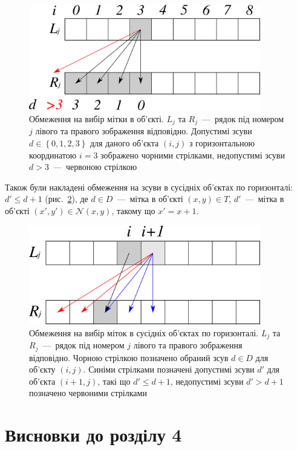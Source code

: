 \begin{figure}[h]
  \centering
  \includegraphics[width=0.9\textwidth]{images/disparity_restriction_vertex}
  \caption{Обмеження на вибір мітки в об'єкті.
           $L_j$ та $R_j$~---~рядок під номером $j$
           лівого та правого зображення відповідно.
           Допустимі зсуви $d \in \left\{0, 1, 2, 3 \right\}$
           для даного об'єкта $\left(i, j \right)$
           з горизонтальною координатою $i = 3$
           зображено чорними стрілками,
           недопустимі зсуви $d > 3$~---~червоною стрілкою}
  \label{fig:disparity:restriction:vertex}
\end{figure}

Також були накладені обмеження на зсуви в сусідніх об'єктах по горизонталі:
$d' \le d + 1$ (рис.~\ref{fig:disparity:restriction:edge}),
де $d \in D$~---~мітка в об'єкті $\left(x, y \right) \in T$,
$d'$~---~мітка в об'єкті
$\left(x', y' \right) \in \mathcal{N} \left(x, y \right)$,
такому що $x' = x + 1$.

\begin{figure}[h]
  \centering
  \includegraphics[width=0.9\textwidth]{images/disparity_restriction_edges}
  \caption{Обмеження на вибір міток в сусідніх об'єктах по горизонталі.
           $L_j$ та $R_j$~---~рядок під номером $j$
           лівого та правого зображення відповідно.
           Чорною стрілкою позначено обраний зсув $d \in D$ для об'єкту
           $\left(i, j \right)$.
           Синіми стрілками позначені допустимі зсуви $d'$
           для об'єкта $\left(i + 1, j \right)$, такі що $d' \le d + 1$,
           недопустимі зсуви $d' > d + 1$ позначено червоними стрілками}
  \label{fig:disparity:restriction:edge}
\end{figure}


\section*{Висновки до розділу 4}

